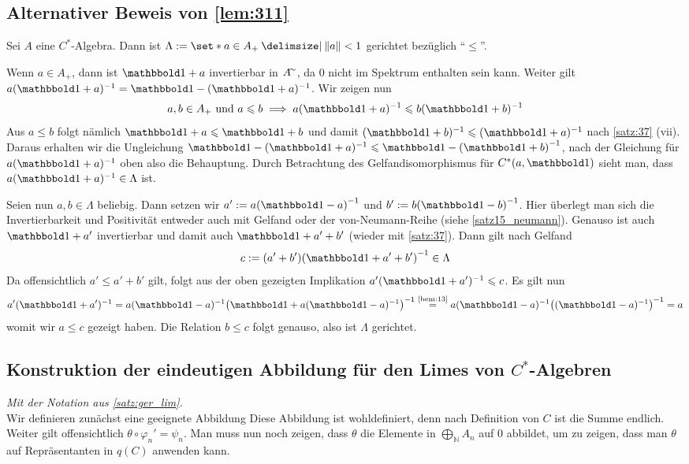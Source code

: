 \subsection{Alternativer Beweis von \autoref{lem:311}} %
\label{sub:alternativer_beweis_lemma_311}
Sei $A$ eine $C^*$-Algebra. Dann ist $\Lambda := \set*{a \in A_+ \given \norm*{a} < 1}$ gerichtet bezüglich \enquote{$\le$}.
\begin{beweis}
	Wenn $a \in A_+$, dann ist $\ind +a$ invertierbar in $A^\simm$, da $0$ nicht im Spektrum enthalten sein kann.
	Weiter gilt $a(\ind +a)^{-1} = \ind - (\ind +a)^{-1}$.
	Wir zeigen nun
	\[
		a,b \in A_+ \text{ und } a \le b \implies a(\ind+a)^{-1} \le b (\ind +b)^{-1} 
	\]
	Aus $a \le b$ folgt nämlich $\ind +a \le \ind +b$ und damit $(\ind +b)^{-1} \le (\ind +a)^{-1}$ nach \autoref{satz:37} (vii).
	Daraus erhalten wir die Ungleichung $\ind - (\ind +a)^{-1} \le \ind - \enbrace*{\ind +b}^{-1}$, nach der Gleichung für $a(\ind +a)^{-1}$ oben also die Behauptung.
	Durch Betrachtung des Gelfandisomorphismus für $C^*(a, \ind)$ sieht man, dass $a(\ind +a)^{-1} \in \Lambda$ ist.
	
	Seien nun $a,b \in \Lambda$ beliebig.
	Dann setzen wir $a' := a \enbrace*{\ind -a}^{-1}$ und $b' := b \enbrace*{\ind -b}^{-1}$. Hier überlegt man sich die Invertierbarkeit und Positivität entweder auch mit Gelfand oder der von-Neumann-Reihe (siehe \ref{satz15_neumann}).
	Genauso ist auch $\ind + a'$ invertierbar und damit auch $\ind + a' +b'$ (wieder mit \ref{satz:37}). 
	Dann gilt nach Gelfand
	\[
		c := (a' + b') \enbrace*{\ind + a' + b'}^{-1} \in \Lambda
	\]
	Da offensichtlich $a' \le a' + b'$ gilt, folgt aus der oben gezeigten Implikation $a'(\ind +a')^{-1} \le c$.
	Es gilt nun
	\[
		a'(\ind +a')^{-1} = a (\ind -a)^{-1} \enbrace*{\ind + a(\ind-a)^{-1}}^{-1} \StackText{\ref{bem:13}}{=} a (\ind -a)^{-1} \enbrace*{(\ind-a)^{-1}}^{-1} = a
	\]
	womit wir $a \le c$ gezeigt haben. 
	Die Relation $b \le c$ folgt genauso, also ist $\Lambda$ gerichtet.
\end{beweis}


\subsection{Konstruktion der eindeutigen Abbildung für den Limes von $C^*$-Algebren} %
\label{sub:konstruktion_limes}
\emph{Mit der Notation aus \autoref{satz:ger_lim}.}\smallskip\\
Wir definieren zunächst eine geeignete Abbildung 
Diese Abbildung ist wohldefiniert, denn nach Definition von $C$ ist die Summe endlich.
Weiter gilt offensichtlich $\theta \circ \varphi_n' = \psi_n$.
Man muss nun noch zeigen, dass $\theta$ die Elemente in $\bigoplus_{\mathbb{N}} A_n$ auf $0$ abbildet, um zu zeigen, dass man $\theta$ auf Repräsentanten in $q(C)$ anwenden kann.


